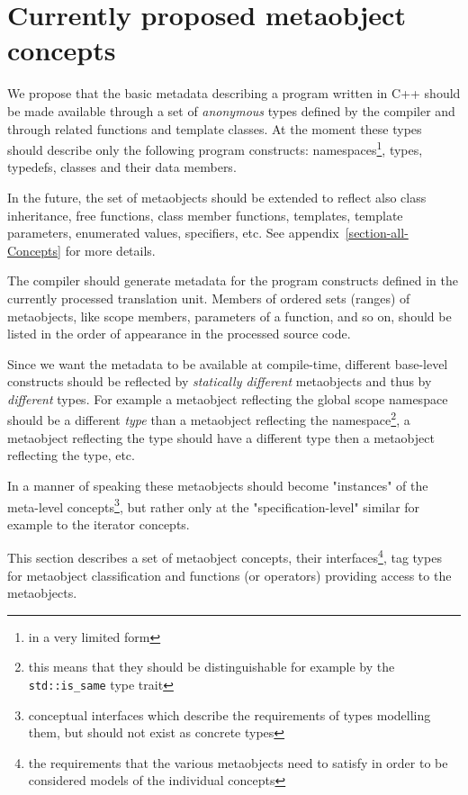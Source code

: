 \section{Currently proposed metaobject concepts}
\label{section-current-Concepts}

We propose that the basic metadata describing a program written
in C++ should be made available through a set of {\em anonymous} types
defined by the compiler and through related functions and template classes.
At the moment these types should describe only the following program
constructs: namespaces\footnote{in a very limited form}, types, typedefs,
classes and their data members.

In the future, the set of metaobjects should be extended to reflect also
class inheritance, free functions, class member functions, templates,
template parameters, enumerated values, specifiers, etc.
See appendix~\ref{section-all-Concepts} for more details.

The compiler should generate metadata for the program constructs defined
in the currently processed translation unit. Members of ordered sets (ranges) of metaobjects,
like scope members, parameters of a function, and so on, should be listed
in the order of appearance in the processed source code.

Since we want the metadata to be available at compile-time,
different base-level constructs should be reflected by
{\em statically different} metaobjects and thus by {\em different} types.
For example a metaobject reflecting the global scope namespace should
be a different {\em type} than a metaobject reflecting the \verb@std@
namespace\footnote{this means that they should be distinguishable for
example by the \texttt{std::is\_same} type trait},
a metaobject reflecting the \verb@int@ type should
have a different type then a metaobject reflecting the \verb@double@
type, etc.

In a manner of speaking these metaobjects should become
"instances" of the meta-level concepts\footnote{conceptual interfaces which
describe the requirements of types modelling them, but
should not exist as concrete types}, but rather only at the
"specification-level" similar for example to the iterator concepts.

This section describes a set of metaobject concepts,
their interfaces\footnote{the requirements that the various metaobjects
need to satisfy in order to be considered models of the individual
concepts},
tag types for metaobject classification and
functions (or operators) providing access to the metaobjects.

